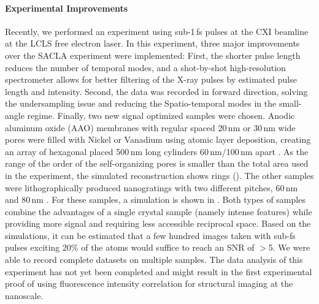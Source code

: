 \paragraph{Experimental Improvements}
Recently, we performed an experiment using sub-1\,fs pulses at the CXI beamline at the LCLS free electron laser. In this experiment, three major improvements over the SACLA experiment were implemented: First, the shorter pulse length reduces the number of temporal modes, and a shot-by-shot high-resolution spectrometer allows for better filtering of the X-ray pulses by estimated pulse length and intensity. Second, the data was recorded in forward direction, solving the undersampling issue and reducing the Spatio-temporal modes in the small-angle regime. Finally, two new signal optimized samples were chosen. Anodic aluminum oxide (AAO) membranes with regular spaced 20\,nm or 30\,nm wide pores were filled with Nickel or Vanadium using atomic layer deposition, creating an array of hexagonal placed 500\,nm long cylinders 60\,nm/100\,nm apart \cite{carina2019}. As the range of the order of the self-organizing pores is smaller than the total area used in the experiment, the simulated reconstruction shows rings ().  The other samples were lithographically produced nanogratings with two different pitches, 60\,nm  and 80\,nm \cite{mojarad2015}. For these samples, a simulation is shown in . Both types of samples combine the advantages of a single crystal sample (namely intense features) while providing more signal and requiring less accessible reciprocal space. 
Based on the simulations, it can be estimated that a few hundred images taken with sub-fs pulses exciting 20\% of the atoms would suffice to reach an SNR of $>$5.
We were able to record complete datasets on multiple samples. The data analysis of this experiment has not yet been completed and might result in the first experimental proof of using fluorescence intensity correlation for structural imaging at the nanoscale.  


